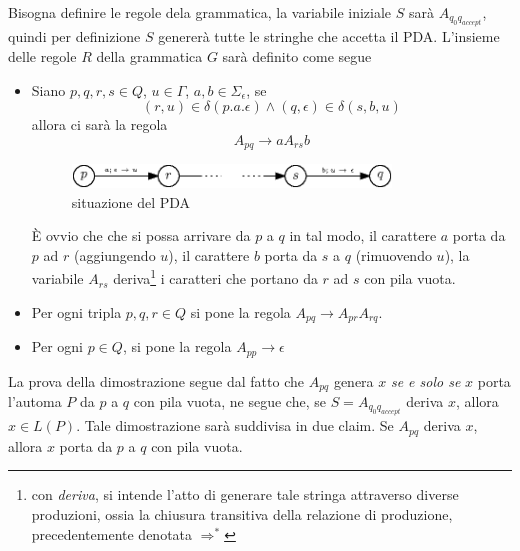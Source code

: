 \documentclass[10pt, letterpaper]{report}
\begin{document}
Bisogna definire le regole dela grammatica, la variabile iniziale $S$ sarà $A_{q_0q_{accept}}$, quindi per 
definizione $S$ genererà tutte le stringhe che accetta il PDA. L'insieme delle regole $R$ della grammatica $G$ sarà 
definito come segue \begin{itemize}
    \item Siano $p,q,r,s\in Q$, $u\in\Gamma$, $a,b\in\Sigma_\epsilon$, se $$ (r,u)\in\delta(p.a.\epsilon)\land  
    (q,\epsilon)\in\delta(s,b,u)$$ allora ci sarà la regola $$A_{pq}\longrightarrow aA_{rs}b $$\begin{center}\begin{figure}[h!]
        \centering
        \includegraphics[width=0.8\textwidth ]{images/dimoPDACFG1.eps}
        \caption{situazione del PDA}
        \label{fig:dimoPDACFG1}
    \end{figure}\end{center}
    È ovvio che che si possa arrivare da $p$ a $q$ in tal modo, il carattere $a$ porta da $p$ ad $r$ (aggiungendo $u$), il 
    carattere $b$ porta da $s$ a $q$ (rimuovendo $u$), la variabile $A_{rs}$ deriva\footnote{
        con \textit{deriva}, si intende l'atto di generare tale stringa attraverso diverse produzioni, ossia la 
        chiusura transitiva della relazione di produzione, precedentemente denotata $\Rightarrow^*$
    } i caratteri che portano da $r$ ad $s$ con pila vuota.
    \item Per ogni tripla $p,q,r\in Q$ si pone la regola $A_{pq}\longrightarrow A_{pr}A_{rq}$. 
    \item Per ogni $p\in Q$, si pone la regola $A_{pp}\longrightarrow \epsilon$
\end{itemize}
La prova della dimostrazione segue dal fatto che $A_{pq}$ genera $x$ \textit{se e solo se} $x$ porta l'automa $P$ da 
$p$ a $q$ con pila vuota, ne segue che, se $S=A_{q_0q_{accept}}$ deriva $x$, allora $x\in L(P)$. Tale dimostrazione sarà 
suddivisa in due claim.\acc 
{} Se $A_{pq}$ deriva $x$, allora $x$ porta da $p$ a $q$ con pila vuota. \acc 
\end{document}
